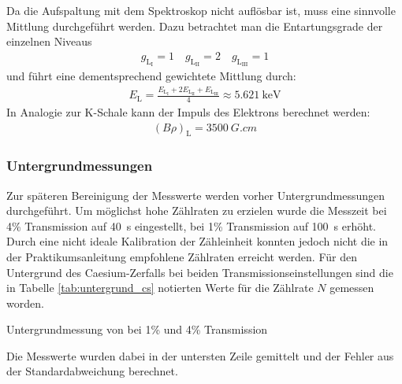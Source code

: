 \documentclass[11pt, a4paper]{article}
\numberwithin{equation}{section}
\begin{document}
Da die Aufspaltung mit dem Spektroskop nicht auflösbar ist, muss eine sinnvolle Mittlung durchgeführt werden.
Dazu betrachtet man die Entartungsgrade der einzelnen Niveaus
\begin{align*}
g_{\mathrm{L}_{\mathrm{I}}} = \num{1} \quad
g_{\mathrm{L}_{\mathrm{II}}} = \num{2} \quad
g_{\mathrm{L}_{\mathrm{III}}} = \num{1}
\end{align*}
und führt eine dementsprechend gewichtete Mittlung durch:
\begin{align*}
E_\mathrm{L} = \frac{E_{\mathrm{L}_{\mathrm{I}}} + 2E_{\mathrm{L}_{\mathrm{II}}} + E_{\mathrm{L}_{\mathrm{III}}}}{4} \approx \SI{5,621}{\kilo\electronvolt}
\end{align*}
In Analogie zur K-Schale kann der Impuls des Elektrons berechnet werden:
\begin{align}
\left(B \rho \right)_\mathrm{L} = \SI{3500}{G.cm}
\end{align}

\subsubsection{Untergrundmessungen}
\label{sssec:untergrund1}
Zur späteren Bereinigung der Messwerte werden vorher Untergrundmessungen durchgeführt.
Um möglichst hohe Zählraten zu erzielen wurde die Messzeit bei 4\% Transmission auf \SI{40}{\second} eingestellt, bei 1\% Transmission auf \SI{100}{\second} erhöht.
Durch eine nicht ideale Kalibration der Zähleinheit konnten jedoch nicht die in der Praktikumsanleitung empfohlene Zählraten erreicht werden.
Für den Untergrund des Caesium-Zerfalls bei beiden Transmissionseinstellungen sind die in Tabelle \ref{tab:untergrund_cs} notierten Werte für die Zählrate $N$ gemessen worden.
\begin{table}[h]
	\centering
	
	\caption{Untergrundmessung von  bei 1\% und 4\% Transmission}
	\label{tab:untergrund_cs}
\end{table}
Die Messwerte wurden dabei in der untersten Zeile gemittelt und der Fehler aus der Standardabweichung berechnet.
\end{document}
